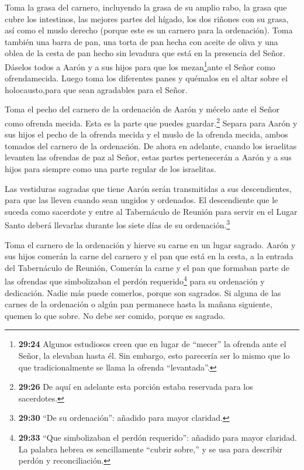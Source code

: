  Toma la grasa del carnero, incluyendo la grasa de su
amplio rabo, la grasa que cubre los intestinos, las mejores partes del
hígado, los dos riñones con su grasa, así como el muslo derecho (porque
este es un carnero para la ordenación).  Toma también una
barra de pan, una torta de pan hecha con aceite de oliva y una oblea de
la cesta de pan hecho sin levadura que está en la presencia del Señor.
 Dáselos todos a Aarón y a sus hijos para que los
mezan\footnote{\textbf{29:24} Algunos estudiosos creen que en lugar de
  ``mecer'' la ofrenda ante el Señor, la elevaban hasta él. Sin embargo,
  esto parecería ser lo mismo que lo que tradicionalmente se llama la
  ofrenda ``levantada''.}ante el Señor como ofrendamecida. 
Luego toma los diferentes panes y quémalos en el altar sobre el
holocausto,para que sean agradables para el Señor.

 Toma el pecho del carnero de la ordenación de Aarón y
mécelo ante el Señor como ofrenda mecida. Esta es la parte que puedes
guardar.\footnote{\textbf{29:26} De aquí en adelante esta porción estaba
  reservada para los sacerdotes.}  Separa para Aarón y sus
hijos el pecho de la ofrenda mecida y el muslo de la ofrenda mecida,
ambos tomados del carnero de la ordenación.  De ahora en
adelante, cuando los israelitas levanten las ofrendas de paz al Señor,
estas partes pertenecerán a Aarón y a sus hijos para siempre como una
parte regular de los israelitas.

 Las vestiduras sagradas que tiene Aarón serán transmitidas
a sus descendientes, para que las lleven cuando sean ungidos y
ordenados.  El descendiente que le suceda como sacerdote y
entre al Tabernáculo de Reunión para servir en el Lugar Santo deberá
llevarlas durante los siete días de su ordenación.\footnote{\textbf{29:30}
  ``De su ordenación'': añadido para mayor claridad.}

 Toma el carnero de la ordenación y hierve su carne en un
lugar sagrado.  Aarón y sus hijos comerán la carne del
carnero y el pan que está en la cesta, a la entrada del Tabernáculo de
Reunión,  Comerán la carne y el pan que formaban parte de
las ofrendas que simbolizaban el perdón requerido\footnote{\textbf{29:33}
  ``Que simbolizaban el perdón requerido'': añadido para mayor claridad.
  La palabra hebrea es sencillamente ``cubrir sobre,'' y se usa para
  describir perdón y reconciliación.} para su ordenación y dedicación.
Nadie más puede comerlos, porque son sagrados.  Si alguna
de las carnes de la ordenación o algún pan permanece hasta la mañana
siguiente, quemen lo que sobre. No debe ser comido, porque es sagrado.

